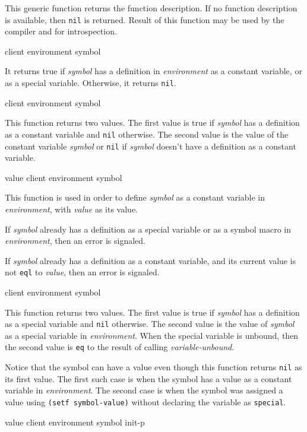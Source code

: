This generic function returns the function description. If no function
description is available, then \texttt{nil} is returned. Result of this
function may be used by the compiler and for introspection.

 {client environment symbol}

It returns true if \textit{symbol} has a definition in \textit{environment} as
a constant variable, or as a special variable. Otherwise, it returns
\texttt{nil}.

 {client environment symbol}

This function returns two values. The first value is true if \textit{symbol}
has a definition as a constant variable and \texttt{nil} otherwise. The second
value is the value of the constant variable \textit{symbol} or \texttt{nil} if
\textit{symbol} doesn't have a definition as a constant variable.

 {value client environment symbol}

This function is used in order to define \textit{symbol} as a constant
variable in \textit{environment}, with \textit{value} as its value.

If \textit{symbol} already has a definition as a special variable or
as a symbol macro in \textit{environment}, then an error is signaled.

If \textit{symbol} already has a definition as a constant variable,
and its current value is not \texttt{eql} to \textit{value}, then an
error is signaled.

 {client environment symbol}

This function returns two values. The first value is true if \textit{symbol}
has a definition as a special variable and \texttt{nil} otherwise. The second
value is the value of \textit{symbol} as a special variable in
\textit{environment}. When the special variable is unbound, then the second
value is \texttt{eq} to the result of calling \textit{variable-unbound}.

Notice that the symbol can have a value even though this function returns
\texttt{nil} as its first value.  The first such case is when the symbol has a
value as a constant variable in \textit{environment}.  The second case is when
the symbol was assigned a value using \texttt{(setf symbol-value)} without
declaring the variable as \texttt{special}.

 {value client environment symbol init-p}

